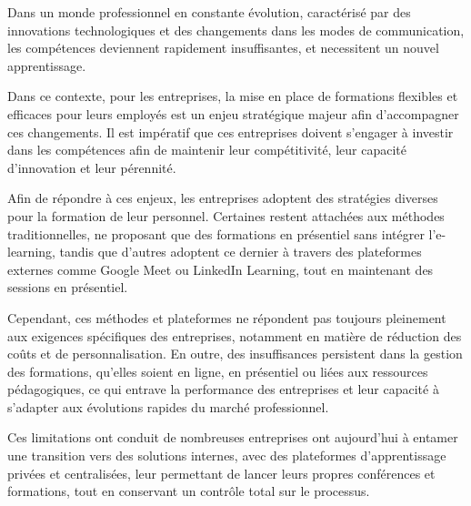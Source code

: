 \documentclass{article}
\begin{document}
\vspace{1cm}



\hspace{1cm}Dans un monde professionnel en constante évolution, caractérisé par des innovations technologiques et des changements dans les modes de communication, les compétences deviennent rapidement insuffisantes, et necessitent un nouvel apprentissage. 

\vspace{0.5cm}

Dans ce contexte, pour les entreprises, la mise en place de formations flexibles et efficaces pour leurs employés est un enjeu stratégique majeur afin d’accompagner ces changements. Il est impératif que ces entreprises doivent  s’engager à investir dans les compétences afin de maintenir leur compétitivité, leur capacité d’innovation et leur pérennité. 

\vspace{0.5cm}


Afin de répondre à ces enjeux, les entreprises adoptent des stratégies diverses pour la formation de leur personnel. Certaines restent attachées aux méthodes traditionnelles, ne proposant que des formations en présentiel sans intégrer l’e-learning, tandis que d’autres adoptent ce dernier à travers des plateformes externes comme Google Meet ou LinkedIn Learning, tout en maintenant des 
sessions en présentiel. 

\vspace{0.5cm}


Cependant, ces méthodes et plateformes ne répondent pas toujours pleinement aux exigences spécifiques des entreprises, notamment en matière de réduction des coûts et de personnalisation. En outre, des insuffisances persistent dans la gestion des formations, qu’elles soient en ligne, en présentiel ou liées aux ressources pédagogiques, ce qui entrave la performance des entreprises et leur capacité à s’adapter aux évolutions rapides du marché professionnel. 

\vspace{0.5cm}

Ces limitations ont conduit de nombreuses entreprises ont aujourd’hui à  entamer une transition vers des solutions internes, avec des plateformes d’apprentissage privées et centralisées, leur permettant de lancer leurs propres conférences et formations, tout en conservant un contrôle total sur le processus. 

\vspace{0.5cm}
\end{document}
